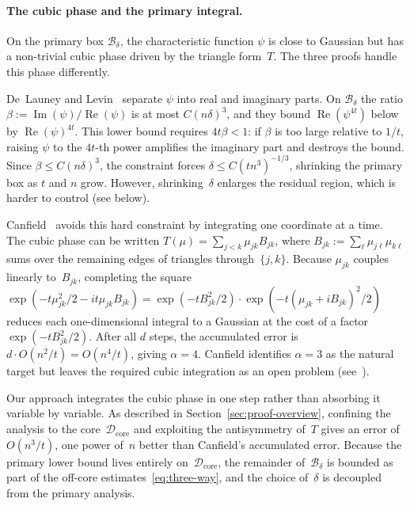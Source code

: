 \documentclass[11pt]{article}
\theoremstyle{definition}
\newcommand{\Bbox}{\mathcal{B}}
\newcommand{\corereg}{\mathcal{D}_\mathrm{core}}
\begin{document}
\paragraph{The cubic phase and the primary integral.}
On the primary box \(\Bbox_\delta\), the characteristic function \(\psi\) is close to Gaussian but has a non-trivial cubic phase driven by the triangle form~\(T\). The three proofs handle this phase differently.

De~Launey and Levin~\cite{DL10} separate \(\psi\) into real and imaginary parts. On \(\Bbox_\delta\) the ratio \(\beta:=\operatorname{Im}(\psi)/\operatorname{Re}(\psi)\) is at most \(C(n\delta)^3\), and they bound \(\operatorname{Re}(\psi^{4t})\) below by \(\operatorname{Re}(\psi)^{4t}\). This lower bound requires \(4t\beta<1\): if \(\beta\) is too large relative to \(1/t\), raising \(\psi\) to the \(4t\)-th power amplifies the imaginary part and destroys the bound. Since \(\beta\le C(n\delta)^3\), the constraint forces \(\delta\le C(tn^3)^{-1/3}\), shrinking the primary box as \(t\) and \(n\) grow. However, shrinking~\(\delta\) enlarges the residual region, which is harder to control (see below).

Canfield~\cite{Can} avoids this hard constraint by integrating one coordinate at a time. The cubic phase can be written \(T(\mu)=\sum_{j<k}\mu_{jk}B_{jk}\), where \(B_{jk}:=\sum_\ell\mu_{j\ell}\mu_{k\ell}\) sums over the remaining edges of triangles through~\(\{j,k\}\). Because \(\mu_{jk}\) couples linearly to~\(B_{jk}\), completing the square \(\exp(-t\mu_{jk}^2/2-it\mu_{jk}B_{jk})=\exp(-tB_{jk}^2/2)\cdot\exp(-t(\mu_{jk}+iB_{jk})^2/2)\) reduces each one-dimensional integral to a Gaussian at the cost of a factor \(\exp(-tB_{jk}^2/2)\). After all \(d\) steps, the accumulated error is \(d\cdot O(n^2/t)=O(n^4/t)\), giving \(\alpha=4\). Canfield identifies \(\alpha=3\) as the natural target but leaves the required cubic integration as an open problem (see~\cite{Can}).

Our approach integrates the cubic phase in one step rather than absorbing it variable by variable. As described in Section~\ref{sec:proof-overview}, confining the analysis to the core~\(\corereg\) and exploiting the antisymmetry of~\(T\) gives an error of \(O(n^3/t)\), one power of~\(n\) better than Canfield's accumulated error. Because the primary lower bound lives entirely on~\(\corereg\), the remainder of~\(\Bbox_\delta\) is bounded as part of the off-core estimates~\eqref{eq:three-way}, and the choice of~\(\delta\) is decoupled from the primary analysis.
\end{document}
